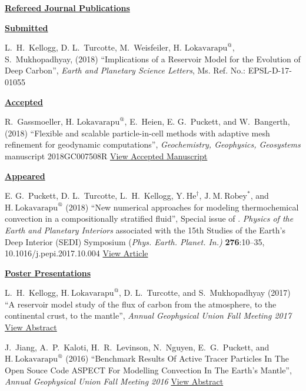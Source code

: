 \documentclass[11pt]{ltxdoc}
\begin{document}
\noindent
\textbf{\underline{Refereed Journal Publications}}


\noindent
\textbf{\underline{Submitted}}


\hangindent 20pt
L.~H.~Kellogg, D. L.~Turcotte, M.~Weisfeiler, $\textrm{H.~Lokavarapu}^@$, S.~Mukhopadhyay, (2018) 
``Implications of a Reservoir Model for the
Evolution of Deep Carbon'', 
\textit{Earth and Planetary Science Letters}, Ms. Ref. No.:  EPSL-D-17-01055


\noindent
\textbf{\underline{Accepted}}

\hangindent 20pt
R.~Gassmoeller,  $\textrm{H.~Lokavarapu}^@$, E.~Heien, E. G.~Puckett, and W.~Bangerth, (2018) 
``Flexible and scalable particle-in-cell methods with adaptive mesh refinement for geodynamic computations'', 
\textit{Geochemistry, Geophysics, Geosystems} manuscript 2018GC007508R 
\href{https://www.math.ucdavis.edu/~egp/PUBLICATIONS/JOURNAL_ARTICLES/ACCEPTED/RG-HL-EH-EGP-WB-2018.pdf}{View Accepted Manuscript}

\noindent
\textbf{\underline{Appeared}}

\vskip 06pt


\hangindent 20pt
E. G.~Puckett, D. L.~Turcotte, L.~H.~Kellogg,  $\mathrm{Y.~He}^{\dagger}$, $\mathrm{J.~M.~Robey}^{*}$, and 
$\mathrm{H.~Lokavarapu}^{@}$ (2018)
``New numerical approaches for modeling thermochemical convection in a compositionally stratified fluid'', 
Special issue of . \textit{Physics of the Earth and Planetary Interiors} associated with the 15th Studies of the Earth's Deep Interior (SEDI) Symposium (\textit{Phys. Earth. Planet. In.)} \textbf{276}:10–35, 10.1016/j.pepi.2017.10.004
\href{https://www.math.ucdavis.edu/~egp/PUBLICATIONS/JOURNAL_ARTICLES/APPEARED/2018/EGP-DLT-YH-HL-JMR-LHK-2018.pdf}{View Article}

\noindent
\textbf{\underline{Poster Presentations}}


\hangindent 20pt
L.~H.~Kellogg, $\mathrm{H.~Lokavarapu}^{@}$, D. L.~Turcotte, and S.~Mukhopadhyay (2017) 
``A reservoir model study of the flux of carbon from the atmosphere, to the continental crust, to the mantle'', 
\textit{Annual Geophysical Union Fall Meeting 2017}
\href{http://adsabs.harvard.edu/abs/2017AGUFMDI14A..06K}{View Abstract}

\hangindent 20pt
J.~Jiang, A.~P.~Kaloti, H.~R.~Levinson, N.~Nguyen, E.~G.~Puckett, and $\mathrm{H.~Lokavarapu}^{@}$ (2016) 
``Benchmark Results Of Active Tracer Particles In The Open Souce Code ASPECT For Modelling Convection In The Earth's Mantle'', 
\textit{Annual Geophysical Union Fall Meeting 2016}
\href{http://adsabs.harvard.edu/abs/2016AGUFM.T23C2946J}{View Abstract}
\end{document}
